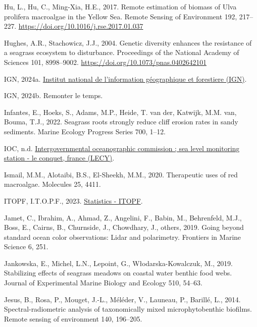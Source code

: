 \documentclass[
  letterpaper,
  11pt,
  english,
  singlespacing,
  headsepline]{MastersDoctoralThesis}
\newlength{\cslhangindent}
\newenvironment{CSLReferences}[2] %
 {\begin{list}{}{%
  \setlength{\itemindent}{0pt}
  \setlength{\leftmargin}{0pt}
  \setlength{\parsep}{0pt}
  \ifodd #1
   \setlength{\leftmargin}{\cslhangindent}
   \setlength{\itemindent}{-1\cslhangindent}
  \fi
  \setlength{\itemsep}{#2\baselineskip}}}
 {\end{list}}
\begin{document}
\begin{CSLReferences}{1}{0}
Hu, L., Hu, C., Ming-Xia, H.E., 2017. {Remote estimation of biomass of
Ulva prolifera macroalgae in the Yellow Sea}. Remote Sensing of
Environment 192, 217--227.
\url{https://doi.org/10.1016/j.rse.2017.01.037}

Hughes, A.R., Stachowicz, J.J., 2004. Genetic diversity enhances the
resistance of a seagrass ecosystem to disturbance. Proceedings of the
National Academy of Sciences 101, 8998--9002.
\url{https://doi.org/10.1073/pnas.0402642101}

IGN, 2024a. \href{https://www.ign.fr}{Institut national de l'information
géographique et forestiere (IGN)}.

IGN, 2024b. Remonter le temps.

Infantes, E., Hoeks, S., Adams, M.P., Heide, T. van der, Katwijk, M.M.
van, Bouma, T.J., 2022. Seagrass roots strongly reduce cliff erosion
rates in sandy sediments. Marine Ecology Progress Series 700, 1--12.

IOC, n.d.
\href{https://www.ioc-sealevelmonitoring.org/station.php?code\%20=\%20lecy}{Intergovernmental
oceanographic commission ; sea level monitoring station - le conquet,
france (LECY)}.

Ismail, M.M., Alotaibi, B.S., El-Sheekh, M.M., 2020. Therapeutic uses of
red macroalgae. Molecules 25, 4411.

ITOPF, I.T.O.P.F., 2023.
\href{https://www.itopf.org/knowledge-resources/data-statistics/statistics/}{Statistics
- ITOPF}.

Jamet, C., Ibrahim, A., Ahmad, Z., Angelini, F., Babin, M., Behrenfeld,
M.J., Boss, E., Cairns, B., Churnside, J., Chowdhary, J., others, 2019.
Going beyond standard ocean color observations: Lidar and polarimetry.
Frontiers in Marine Science 6, 251.

Jankowska, E., Michel, L.N., Lepoint, G., Włodarska-Kowalczuk, M., 2019.
Stabilizing effects of seagrass meadows on coastal water benthic food
webs. Journal of Experimental Marine Biology and Ecology 510, 54--63.

Jesus, B., Rosa, P., Mouget, J.-L., Méléder, V., Launeau, P., Barillé,
L., 2014. Spectral-radiometric analysis of taxonomically mixed
microphytobenthic biofilms. Remote sensing of environment 140, 196--205.


\end{CSLReferences}
\end{document}
